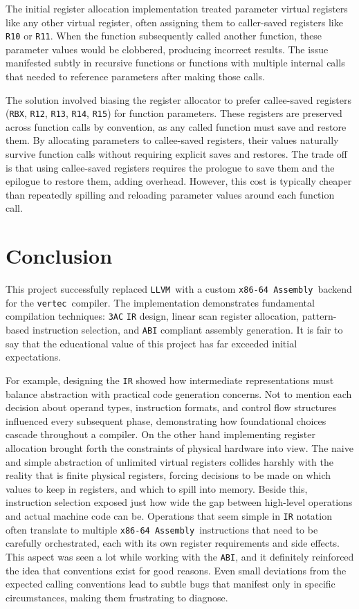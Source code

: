 \documentclass[11pt]{article}
\newcommand{\code}[1]{\texttt{#1}}
\newcommand{\constant}[1]{\texttt{#1}}
\newcommand{\vertec}{\texttt{vertec}}
\newcommand{\llvm}{\texttt{LLVM}}
\newcommand{\asm}{\texttt{x86-64 Assembly}}
\begin{document}
The initial register allocation implementation treated parameter virtual registers like any other virtual register, often assigning them to caller-saved registers like \code{R10} or \code{R11}. When the function subsequently called another function, these parameter values would be clobbered, producing incorrect results. The issue manifested subtly in recursive functions or functions with multiple internal calls that needed to reference parameters after making those calls.

The solution involved biasing the register allocator to prefer callee-saved registers (\code{RBX}, \code{R12}, \code{R13}, \code{R14}, \code{R15}) for function parameters. These registers are preserved across function calls by convention, as any called function must save and restore them. By allocating parameters to callee-saved registers, their values naturally survive function calls without requiring explicit saves and restores. The trade off is that using callee-saved registers requires the prologue to save them and the epilogue to restore them, adding overhead. However, this cost is typically cheaper than repeatedly spilling and reloading parameter values around each function call.

\newpage

\section{Conclusion}

This project successfully replaced \llvm\ with a custom \asm\ backend for the \vertec\ compiler. The implementation demonstrates fundamental compilation techniques: \constant{3AC} \constant{IR} design, linear scan register allocation, pattern-based instruction selection, and \constant{ABI} compliant assembly generation. It is fair to say that the educational value of this project has far exceeded initial expectations.

For example, designing the \constant{IR} showed how intermediate representations must balance abstraction with practical code generation concerns. Not to mention each decision about operand types, instruction formats, and control flow structures influenced every subsequent phase, demonstrating how foundational choices cascade throughout a compiler. On the other hand implementing register allocation brought forth the constraints of physical hardware into view. The naive and simple abstraction of unlimited virtual registers collides harshly with the reality that is finite physical registers, forcing decisions to be made on which values to keep in registers, and which to spill into memory. Beside this, instruction selection exposed just how wide the gap between high-level operations and actual machine code can be. Operations that seem simple in \constant{IR} notation often translate to multiple \asm\ instructions that need to be carefully orchestrated, each with its own register requirements and side effects. This aspect was seen a lot while working with the \constant{ABI}, and it definitely reinforced the idea that conventions exist for good reasons. Even small deviations from the expected calling conventions lead to subtle bugs that manifest only in specific circumstances, making them frustrating to diagnose.
\end{document}

